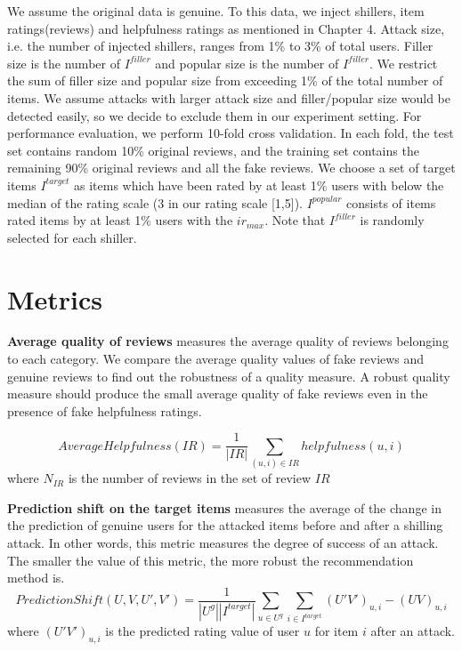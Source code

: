 \documentclass[master,english,final]{kaist-ucs}
\begin{document}
We assume the original data is genuine.
To this data, we inject shillers, item ratings(reviews) and helpfulness ratings as mentioned in Chapter 4.
Attack size, i.e. the number of injected shillers, ranges from 1\% to 3\% of total users.
Filler size is the number of $I^{filler}$ and popular size is the number of $I^{filler}$.
We restrict the sum of filler size and popular size from exceeding 1\% of the total number of items.
We assume attacks with larger attack size and filler/popular size would be detected easily, so we decide to exclude them in our experiment setting.
For performance evaluation, we perform 10-fold cross validation.
In each fold, the test set contains random 10\% original reviews, and the training set contains the remaining 90\% original reviews and all the fake reviews.
We choose a set of target items $I^{target}$ as items which have been rated by at least 1\% users with below the median of the rating scale (3 in our rating scale [1,5]).
$I^{popular}$ consists of items rated items by at least 1\% users with the $ir_{max}$.
Note that $I^{filler}$ is randomly selected for each shiller.


\section{Metrics}
\textbf{Average quality of reviews} measures the average quality of reviews belonging to each category.
We compare the average quality values of fake reviews and genuine reviews to find out the robustness of a quality measure.
A robust quality measure should produce the small average quality of fake reviews even in the presence of fake helpfulness ratings.

\begin{equation}
AverageHelpfulness(IR) = \frac{1}{|IR|} \sum_{ (u,i) \in IR } helpfulness(u,i)
\end{equation}
where $N_{IR}$ is the number of reviews in the set of review $IR$

\textbf{Prediction shift on the target items} measures the average of the change in the prediction of genuine users for the attacked items before and after a shilling attack.
In other words, this metric measures the degree of success of an attack.
The smaller the value of this metric, the more robust the recommendation method is.
\begin{equation}
PredictionShift(U,V,U',V') = \frac{1}{|U^g||I^{target}|} \sum_{u \in U^g} \sum_{i \in I^{target}} (U'V')_{u,i}-(UV)_{u,i}
\end{equation}
where $(U'V')_{u,i}$ is the predicted rating value of user $u$ for item $i$ after an attack.
\end{document}
